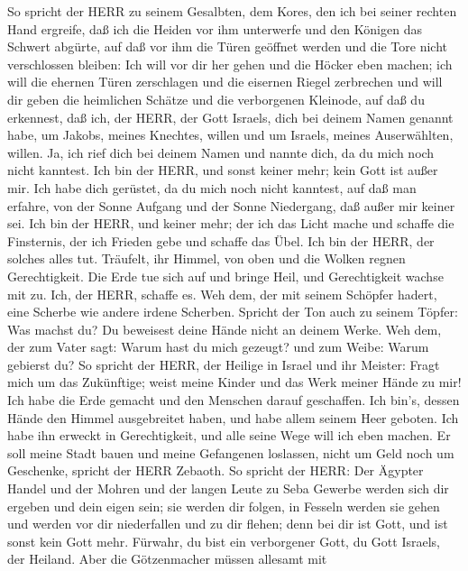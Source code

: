  So spricht der HERR zu seinem Gesalbten, dem Kores, den ich
bei seiner rechten Hand ergreife, daß ich die Heiden vor ihm unterwerfe
und den Königen das Schwert abgürte, auf daß vor ihm die Türen geöffnet
werden und die Tore nicht verschlossen bleiben:  Ich will
vor dir her gehen und die Höcker eben machen; ich will die ehernen Türen
zerschlagen und die eisernen Riegel zerbrechen  und will dir
geben die heimlichen Schätze und die verborgenen Kleinode, auf daß du
erkennest, daß ich, der HERR, der Gott Israels, dich bei deinem Namen
genannt habe,  um Jakobs, meines Knechtes, willen und um
Israels, meines Auserwählten, willen. Ja, ich rief dich bei deinem Namen
und nannte dich, da du mich noch nicht kanntest.  Ich bin
der HERR, und sonst keiner mehr; kein Gott ist außer mir. Ich habe dich
gerüstet, da du mich noch nicht kanntest,  auf daß man
erfahre, von der Sonne Aufgang und der Sonne Niedergang, daß außer mir
keiner sei. Ich bin der HERR, und keiner mehr;  der ich das
Licht mache und schaffe die Finsternis, der ich Frieden gebe und schaffe
das Übel. Ich bin der HERR, der solches alles tut. 
Träufelt, ihr Himmel, von oben und die Wolken regnen Gerechtigkeit. Die
Erde tue sich auf und bringe Heil, und Gerechtigkeit wachse mit zu. Ich,
der HERR, schaffe es.  Weh dem, der mit seinem Schöpfer
hadert, eine Scherbe wie andere irdene Scherben. Spricht der Ton auch zu
seinem Töpfer: Was machst du? Du beweisest deine Hände nicht an deinem
Werke.  Weh dem, der zum Vater sagt: Warum hast du mich
gezeugt? und zum Weibe: Warum gebierst du?  So spricht der
HERR, der Heilige in Israel und ihr Meister: Fragt mich um das
Zukünftige; weist meine Kinder und das Werk meiner Hände zu mir!
 Ich habe die Erde gemacht und den Menschen darauf
geschaffen. Ich bin's, dessen Hände den Himmel ausgebreitet haben, und
habe allem seinem Heer geboten.  Ich habe ihn erweckt in
Gerechtigkeit, und alle seine Wege will ich eben machen. Er soll meine
Stadt bauen und meine Gefangenen loslassen, nicht um Geld noch um
Geschenke, spricht der HERR Zebaoth.  So spricht der HERR:
Der Ägypter Handel und der Mohren und der langen Leute zu Seba Gewerbe
werden sich dir ergeben und dein eigen sein; sie werden dir folgen, in
Fesseln werden sie gehen und werden vor dir niederfallen und zu dir
flehen; denn bei dir ist Gott, und ist sonst kein Gott mehr.
 Fürwahr, du bist ein verborgener Gott, du Gott Israels,
der Heiland.  Aber die Götzenmacher müssen allesamt mit
